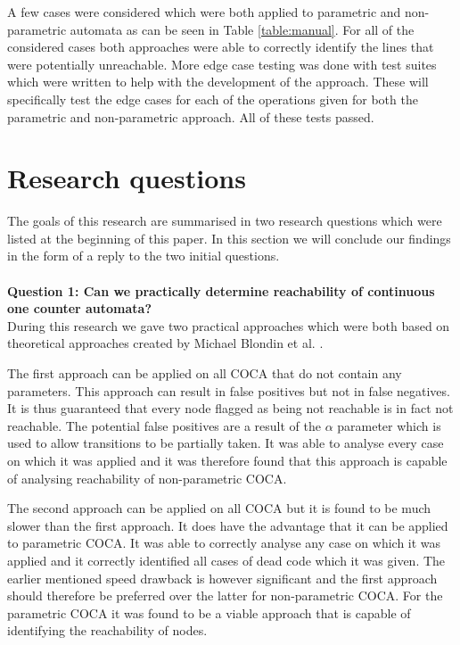 \documentclass[12pt]{thesis}
\begin{document}
A few cases were considered which were both applied to parametric and non-parametric automata as can be seen in Table \ref{table:manual}. For all of the considered cases both approaches were able to correctly identify the lines that were potentially unreachable. More edge case testing was done with test suites which were written to help with the development of the approach. These will specifically test the edge cases for each of the operations given for both the parametric and non-parametric approach. All of these tests passed.

\chapter{Research questions}
The goals of this research are summarised in two research questions which were listed at the beginning of this paper. In this section we will conclude our findings in the form of a reply to the two initial questions.\\
\\
\noindent
\textbf{Question 1: Can we practically determine reachability of continuous one counter automata?}\\
During this research we gave two practical approaches which were both based on theoretical approaches created by Michael Blondin et al. \cite{blondin2021continuous}. 

The first approach can be applied on all COCA that do not contain any parameters. This approach can result in false positives but not in false negatives. It is thus guaranteed that every node flagged as being not reachable is in fact not reachable. The potential false positives are a result of the $\alpha$ parameter which is used to allow transitions to be partially taken. It was able to analyse every case on which it was applied and it was therefore found that this approach is capable of analysing reachability of non-parametric COCA.

The second approach can be applied on all COCA but it is found to be much slower than the first approach. It does have the advantage that it can be applied to parametric COCA. It was able to correctly analyse any case on which it was applied and it correctly identified all cases of dead code which it was given. The earlier mentioned speed drawback is however significant and the first approach should therefore be preferred over the latter for non-parametric COCA. For the parametric COCA it was found to be a viable approach that is capable of identifying the reachability of nodes.
\end{document}
